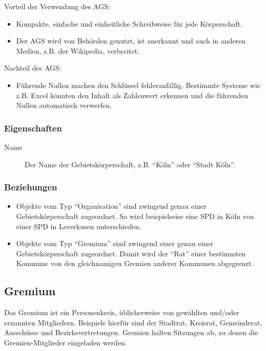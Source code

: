 Vorteil der Verwendung des AGS:

\begin{itemize}
\item
  Kompakte, einfache und einheitliche Schreibweise für jede
  Körperschaft.
\item
  Der AGS wird von Behörden genutzt, ist anerkannt und auch in anderen
  Medien, z.B. der Wikipedia, verbreitet.
\end{itemize}

Nachteil des AGS:

\begin{itemize}
\item
  Führende Nullen machen den Schlüssel fehleranfällig. Bestimmte Systeme
  wie z.B. Excel könnten den Inhalt als Zahlenwert erkennen und die
  führenden Nullen automatisch verwerfen.
\end{itemize}

\subsubsection{Eigenschaften}

\begin{description}
\item[Name]
Der Name der Gebietskörperschaft, z.B. ``Köln'' oder ``Stadt Köln''.
\end{description}

\subsubsection{Beziehungen}

\begin{itemize}
\item
  Objekte vom Typ ``Organisation'' sind zwingend genau einer
  Gebietskörperschaft zugeordnet. So wird beispielseise eine SPD in Köln
  von einer SPD in Leverkusen unterschieden.
\item
  Objekte vom Typ ``Gremium'' sind zwingend einer genau einer
  Gebietskörperschaft zugeordnet. Damit wird der ``Rat'' einer
  bestimmten Kommune von den gleichnamigen Gremien anderer Kommunen
  abgegrenzt.
\end{itemize}

\subsection{Gremium}

Das Gremium ist ein Personenkreis, üblicherweise von gewählten und/oder
ernannten Mitgliedern. Beispiele hierfür sind der Stadtrat, Kreisrat,
Gemeinderat, Ausschüsse und Bezirksvertretungen. Gremien halten
Sitzungen ab, zu denen die Gremien-Mitglieder eingeladen werden.

